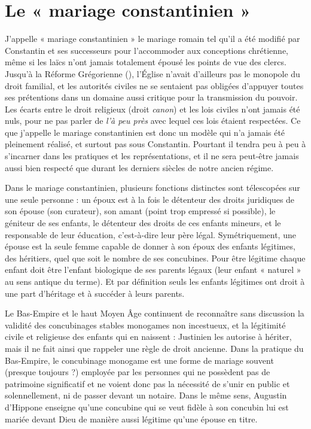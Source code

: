  
\section{Le « mariage constantinien »}


 J'appelle « mariage constantinien » le mariage romain tel qu'il a été modifié par Constantin et ses successeurs pour l'accommoder aux conceptions chrétienne, même si les laïcs n'ont jamais totalement épousé les points de vue des clercs. Jusqu'à la Réforme Grégorienne (), l'Église n'avait d'ailleurs pas le monopole du droit familial, et les autorités civiles ne se sentaient pas obligées d'appuyer toutes ses prétentions dans un domaine aussi critique pour la transmission du pouvoir. Les écarts entre le droit religieux (droit \emph{canon}) et les lois civiles n'ont jamais été nuls, pour ne pas parler de \emph{l'à peu près} avec lequel ces lois étaient respectées. Ce que j'appelle le mariage constantinien est donc un modèle qui n'a jamais été pleinement réalisé, et surtout pas sous Constantin. Pourtant il tendra peu à peu à s'incarner dans les pratiques et les représentations, et il ne sera peut-être jamais aussi bien respecté que durant les derniers siècles de notre ancien régime.

 Dans le mariage constantinien, plusieurs fonctions distinctes sont télescopées sur une seule personne : un époux est à la fois le détenteur des droits juridiques de son épouse (son curateur), son amant (point trop empressé si possible), le géniteur de ses enfants, le détenteur des droits de ces enfants mineurs, et le responsable de leur éducation, c'est-à-dire leur père légal. Symétriquement, une épouse est la seule femme capable de donner à son époux des enfants légitimes, des héritiers, quel que soit le nombre de ses concubines. Pour être légitime chaque enfant doit être l'enfant biologique de ses parents légaux (leur enfant « naturel » au sens antique du terme). Et par définition seuls les enfants légitimes ont droit à une part d'héritage et à succéder à leurs parents.

 Le Bas-Empire et le haut Moyen Âge continuent de reconnaître sans discussion la validité des concubinages stables monogames non incestueux, et la légitimité civile et religieuse des enfants qui en naissent : Justinien les autorise à hériter, mais il ne fait ainsi que rappeler une règle de droit ancienne. Dans la pratique du Bas-Empire, le concubinage monogame est une forme de mariage souvent (presque toujours ?) employée par les personnes qui ne possèdent pas de patrimoine significatif et ne voient donc pas la nécessité de s'unir en public et solennellement, ni de passer devant un notaire. Dans le même sens, Augustin d'Hippone enseigne qu'une concubine qui se veut fidèle à son concubin lui est mariée devant Dieu de manière aussi légitime qu'une épouse en titre.

